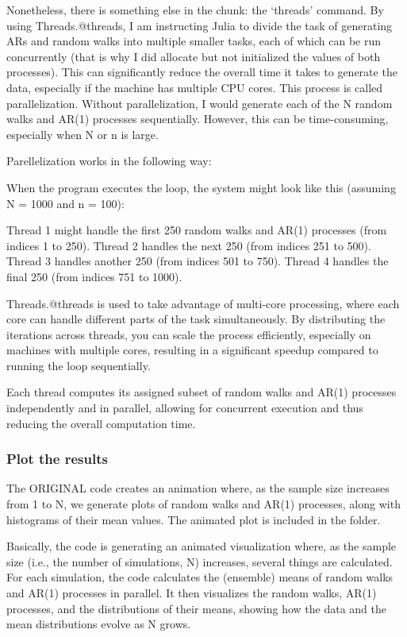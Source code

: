 \documentclass[
]{article}
\begin{document}
Nonetheless, there is something else in the chunk: the `threads'
command. By using Threads.@threads, I am instructing Julia to divide the
task of generating ARs and random walks into multiple smaller tasks,
each of which can be run concurrently (that is why I did allocate but
not initialized the values of both processes). This can significantly
reduce the overall time it takes to generate the data, especially if the
machine has multiple CPU cores. This process is called parallelization.
Without parallelization, I would generate each of the N random walks and
AR(1) processes sequentially. However, this can be time-consuming,
especially when N or n is large.

Parellelization works in the following way:

When the program executes the loop, the system might look like this
(assuming N = 1000 and n = 100):

Thread 1 might handle the first 250 random walks and AR(1) processes
(from indices 1 to 250). Thread 2 handles the next 250 (from indices 251
to 500). Thread 3 handles another 250 (from indices 501 to 750). Thread
4 handles the final 250 (from indices 751 to 1000).

Threads.@threads is used to take advantage of multi-core processing,
where each core can handle different parts of the task simultaneously.
By distributing the iterations across threads, you can scale the process
efficiently, especially on machines with multiple cores, resulting in a
significant speedup compared to running the loop sequentially.

Each thread computes its assigned subset of random walks and AR(1)
processes independently and in parallel, allowing for concurrent
execution and thus reducing the overall computation time.

\hypertarget{plot-the-results}{%
\subsubsection{Plot the results}\label{plot-the-results}}

The ORIGINAL code creates an animation where, as the sample size
increases from 1 to N, we generate plots of random walks and AR(1)
processes, along with histograms of their mean values. The animated plot
is included in the folder.

Basically, the code is generating an animated visualization where, as
the sample size (i.e., the number of simulations, N) increases, several
things are calculated. For each simulation, the code calculates the
(ensemble) means of random walks and AR(1) processes in parallel. It
then visualizes the random walks, AR(1) processes, and the distributions
of their means, showing how the data and the mean distributions evolve
as N grows.
\end{document}
